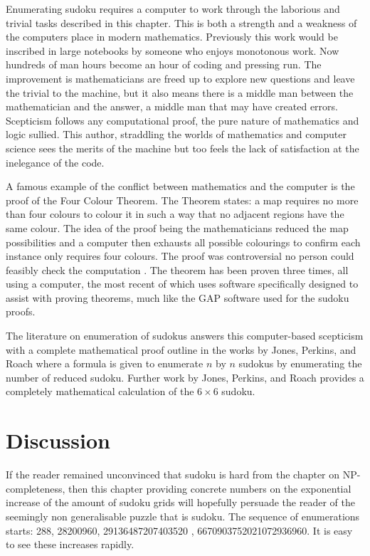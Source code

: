 \documentclass[a4paper,11pt]{report}
\newcounter{col}
\begin{document}
Enumerating sudoku requires a computer to work through the laborious and trivial tasks described in this chapter. This is both a strength and a weakness of the computers place in modern mathematics. Previously this work would be inscribed in large notebooks by someone who enjoys monotonous work. Now hundreds of man hours become an hour of coding and pressing run. The improvement is mathematicians are freed up to explore new questions and leave the trivial to the machine, but it also means there is a middle man between the mathematician and the answer, a middle man that may have created errors. Scepticism follows any computational proof, the pure nature of mathematics and logic sullied. This author, straddling the worlds of mathematics and computer science sees the merits of the machine but too feels the lack of satisfaction at the inelegance of the code. 

A famous example of the conflict between mathematics and the computer is the proof of the Four Colour Theorem. The Theorem states: a map requires no more than four colours to colour it in such a way that no adjacent regions have the same colour. The idea of the proof being the mathematicians reduced the map possibilities and a computer then exhausts all possible colourings to confirm each instance only requires four colours. The proof was controversial no person could feasibly check the computation \cite{swart1980philosophical}. The theorem has been proven three times\cite{appel1989every}\cite{BarNatan1996LieAA}\cite{gonthier2008formal}, all using a computer, the most recent of which uses software specifically designed to assist with proving theorems, much like the GAP software used for the sudoku proofs. 

The literature on enumeration of sudokus answers this computer-based scepticism with a complete mathematical proof outline in the works by Jones, Perkins, and Roach \cite{mima2013number} where a formula is given to enumerate $n$ by $n$ sudokus by enumerating the number of reduced sudoku. Further work by Jones, Perkins, and Roach \cite{jones2014number} provides a completely mathematical calculation of the $6\times6$ sudoku.

\section{Discussion}

If the reader remained unconvinced that sudoku is hard from the chapter on NP-completeness, then this chapter providing concrete numbers on the exponential increase of the amount of sudoku grids will hopefully persuade the reader of the seemingly non generalisable puzzle that is sudoku. The sequence of enumerations starts: 288, 28200960, 29136487207403520 \cite{oeis_a291187} , 6670903752021072936960. It is easy to see these increases rapidly.
\end{document}
